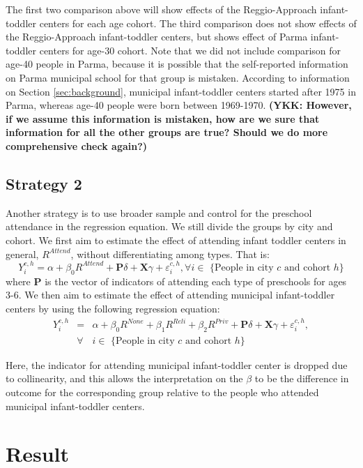 The first two comparison above will show effects of the Reggio-Approach infant-toddler centers for each age cohort. The third comparison does not show effects of the Reggio-Approach infant-toddler centers, but shows effect of Parma infant-toddler centers for age-30 cohort. Note that we did not include comparison for age-40 people in Parma, because it is possible that the self-reported information on Parma municipal school for that group is mistaken. According to information on Section \ref{sec:background}, municipal infant-toddler centers started after 1975 in Parma, whereas age-40 people were born between 1969-1970. \textbf{(YKK: However, if we assume this information is mistaken, how are we sure that information for all the other groups are true? Should we do more comprehensive check again?)}

\subsection{Strategy 2}
Another strategy is to use broader sample and control for the preschool attendance in the regression equation. We still divide the groups by city and cohort. We first aim to estimate the effect of attending infant toddler centers in general, $R^{Attend}$, without differentiating among types. That is:
\begin{equation}
Y_{i}^{c,h} = \alpha + \beta_{0}R^{Attend} + \mathbf{P}\delta + \mathbf{X}\gamma + \varepsilon_{i}^{c,h}, \forall i \in \text{ \{People in city $c$ and cohort $h$\}}
\end{equation}
where $\mathbf{P}$ is the vector of indicators of attending each type of preschools for ages 3-6. We then aim to estimate the effect of attending municipal infant-toddler centers by using the following regression equation:
\begin{eqnarray}
Y_{i}^{c,h} & = & \alpha + \beta_{0}R^{None} + \beta_{1}R^{Reli} + \beta_{2}R^{Priv} + \mathbf{P}\delta +  \mathbf{X}\gamma + \varepsilon_{i}^{c,h}, \\ \nonumber
& \forall & i \in \text{ \{People in city $c$ and cohort $h$\}}
\end{eqnarray}

Here, the indicator for attending municipal infant-toddler center is dropped due to collinearity, and this allows the interpretation on the $\beta$ to be the difference in outcome for the corresponding group relative to the people who attended municipal infant-toddler centers. 


\section{Result}

